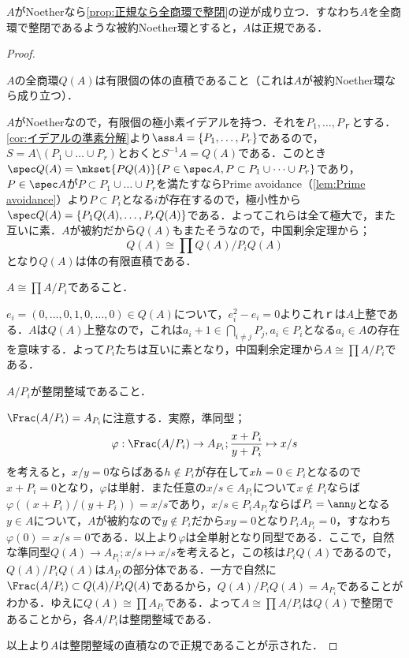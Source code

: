 \begin{thm}
	$A$がNoetherなら\ref{prop:正規なら全商環で整閉}の逆が成り立つ．すなわち$A$を全商環で整閉であるような被約Noether環とすると，$A$は正規である．
\end{thm}

\begin{proof}
	\begin{step}
		\item $A$の全商環$Q(A)$は有限個の体の直積であること（これは$A$が被約Noether環なら成り立つ）．
		
		$A$がNoetherなので，有限個の極小素イデアルを持つ．それを$P_1,\dots,P_ｒ$とする．\ref{cor:イデアルの準素分解}より$\ass A=\{P_1,\dots,P_r\}$であるので，$S=A\setminus(P_1\cup\dots\cup P_r)$とおくと$S^{-1}A=Q(A)$である．このとき$\spec Q(A)=\mkset{PQ(A)}{P\in\spec A,P\subset P_1\cup\dots\cup P_r}$であり，$P\in\spec A$が$P\subset P_1\cup\dots\cup P_r$を満たすならPrime avoidance（\ref{lem:Prime avoidance}）より$P\subset P_i$となる$i$が存在するので，極小性から$\spec Q(A)=\{P_1Q(A),\dots,P_rQ(A)\}$である．よってこれらは全て極大で，また互いに素．$A$が被約だから$Q(A)$もまたそうなので，中国剰余定理から；
		\[Q(A)\cong\prod Q(A)/P_iQ(A)\]
		となり$Q(A)$は体の有限直積である．
		
		\item $A\cong\prod A/P_i$であること．
		
		$e_i=(0,\dots,0,1,0,\dots,0)\in Q(A)$について，$e_i^2-e_i=0$よりこれｒは$A$上整である．$A$は$Q(A)$上整なので，これは$a_i+1\in\bigcap_{i\neq j}P_j,a_i\in P_i$となる$a_i\in A$の存在を意味する．よって$P_i$たちは互いに素となり，中国剰余定理から$A\cong\prod A/P_i$である．
		
		\item $A/P_i$が整閉整域であること．
		
		$\Frac(A/P_i)=A_{P_i}$に注意する．実際，準同型；
		\[\varphi:\Frac(A/P_i)\to A_{P_i};\frac{x+P_i}{y+P_i}\mapsto x/s\]
		を考えると，$x/y=0$ならばある$h\not\in P_i$が存在して$xh=0\in P_i$となるので$x+P_i=0$となり，$\varphi$は単射．また任意の$x/s\in A_{P_i}$について$x\not\in P_i$ならば$\varphi((x+P_i)/(y+P_i))=x/s$であり，$x/s\in P_iA_{P_i}$ならば$P_i=\ann y$となる$y\in A$について，$A$が被約なので$y\not\in P_i$だから$xy=0$となり$P_iA_{P_i}=0$，すなわち$\varphi(0)=x/s=0$である．以上より$\varphi$は全単射となり同型である．ここで，自然な準同型$Q(A)\to A_{P_i};x/s\mapsto x/s$を考えると，この核は$P_iQ(A)$であるので，$Q(A)/P_iQ(A)$は$A_{P_i}$の部分体である．一方で自然に$\Frac(A/P_i)\subset Q(A)/P_iQ(A)$であるから，$Q(A)/P_iQ(A)=A_{P_i}$であることがわかる．ゆえに$Q(A)\cong\prod A_{P_i}$である．よって$A\cong\prod A/P_i$は$Q(A)$で整閉であることから，各$A/P_i$は整閉整域である．
	\end{step}
	以上より$A$は整閉整域の直積なので正規であることが示された．
\end{proof}
